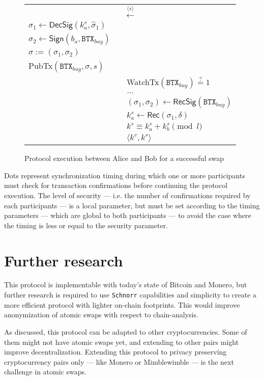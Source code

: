 \documentclass{llncs}
\newcommand{\BTX}{\texttt{BTX}}
\newcommand{\DecSig}{\textsf{DecSig}}
\newcommand{\Sign}{\textsf{Sign}}
\newcommand{\Rec}{\textsf{Rec}}
\newcommand{\hatsigma}{\hat{\sigma}}
\newcommand{\PubTx}{\textsf{PubTx}}
\newcommand{\WatchTx}{\textsf{WatchTx}}
\newcommand{\RecSig}{\textsf{RecSig}}
\begin{document}
\begin{figure}[H]
\begin{table}[H]
{\begin{tabular}{ | l c l | }
          \multicolumn{3}{|c|}{$\xleftarrow{\langle s \rangle}$} \\

          $\sigma_1 \gets \DecSig(k^s_a, \hatsigma_1)$ & & \\
          $\sigma_2 \gets \Sign(b_a, \BTX_\textit{buy})$ & & \\
          $\sigma := (\sigma_1, \sigma_2)$ & & \\
          \PubTx$(\BTX_\textit{buy}, \sigma, s)$ & & \\

          & & \WatchTx$(\BTX_\textit{buy}) \stackrel{?}{=} 1$ \\
          \multicolumn{3}{|c|}{$\dots$} \\

          & & $(\sigma_1, \sigma_2) \gets \RecSig(\BTX_\textit{buy})$ \\
          & & $k^s_a \gets \Rec(\sigma_1, \delta)$ \\
          & & $k^s \equiv k^s_a + k^s_b \pmod l$ \\
          & & $\langle k^v, k^s \rangle$ \\
        \hline
      \end{tabular}}
    \end{table}
  \caption{Protocol execution between Alice and Bob for a successful swap}
  \label{fig:protocol}
\end{figure}

Dots represent synchronization timing during which one or more participants must check for transaction confirmations before continuing the protocol execution. The level of security --- i.e. the number of confirmations required by each participants --- is a local parameter, but must be set according to the timing parameters --- which are global to both participants --- to avoid the case where the timing is less or equal to the security parameter.

\section{Further research}
This protocol is implementable with today's state of Bitcoin and Monero, but further research is required to use \texttt{Schnorr} capabilities and simplicity to create a more efficient protocol with lighter on-chain footprints. This would improve anonymization of atomic swaps with respect to chain-analysis.

As discussed, this protocol can be adapted to other cryptocurrencies. Some of them might not have atomic swaps yet, and extending to other pairs might improve decentralization. Extending this protocol to privacy preserving cryptocurrency pairs only --- like Monero or Mimblewimble --- is the next challenge in atomic swaps.
\end{document}
